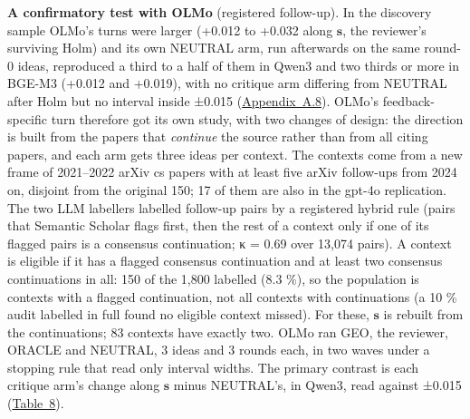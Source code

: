 \documentclass[
  10pt,
]{article}
\begin{document}
\textbf{A confirmatory test with OLMo}
(registered follow-up). In the discovery
sample OLMo's turns were larger (+0.012
to +0.032 along \(\mathbf{s}\), the
reviewer's surviving Holm) and its own
NEUTRAL arm, run afterwards on the same
round-0 ideas, reproduced a third to a
half of them in Qwen3 and two thirds or
more in BGE-M3 (+0.012 and +0.019), with
no critique arm differing from NEUTRAL
after Holm but no interval inside ±0.015
(\hyperref[app:A.8]{Appendix~A.8}).
OLMo's feedback-specific turn therefore
got its own study, with two changes of
design: the direction is built from the
papers that \emph{continue} the source
rather than from all citing papers, and
each arm gets three ideas per context.
The contexts come from a new frame of
2021--2022 arXiv cs papers with at least
five arXiv follow-ups from 2024 on,
disjoint from the original 150; 17 of
them are also in the gpt-4o replication.
The two LLM labellers labelled follow-up
pairs by a registered hybrid rule (pairs
that Semantic Scholar flags first, then
the rest of a context only if one of its
flagged pairs is a consensus
continuation; κ = 0.69 over 13,074
pairs). A context is eligible if it has
a flagged consensus continuation and at
least two consensus continuations in
all: 150 of the 1,800 labelled (8.3 \%),
so the population is contexts with a
flagged continuation, not all contexts
with continuations (a 10 \% audit
labelled in full found no eligible
context missed). For these,
\(\mathbf{s}\) is rebuilt from the
continuations; 83 contexts have exactly
two. OLMo ran GEO, the reviewer, ORACLE
and NEUTRAL, 3 ideas and 3 rounds each,
in two waves under a stopping rule that
read only interval widths. The primary
contrast is each critique arm's change
along \(\mathbf{s}\) minus NEUTRAL's, in
Qwen3, read against ±0.015
(\hyperref[tab:8]{Table~8}).
\end{document}
